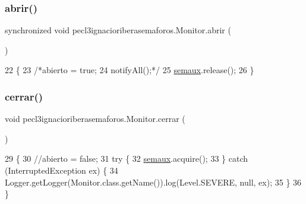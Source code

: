 \subsubsection{\texorpdfstring{abrir()}{abrir()}}
{\footnotesize\ttfamily synchronized void pecl3ignacioriberasemaforos.\+Monitor.\+abrir (\begin{DoxyParamCaption}{ }\end{DoxyParamCaption})\hspace{0.3cm}{\ttfamily [inline]}}


\begin{DoxyCode}
22     \{
23         \textcolor{comment}{/*abierto = true;}
24 \textcolor{comment}{        notifyAll();*/}
25         \mbox{\hyperlink{classpecl3ignacioriberasemaforos_1_1_monitor_add0c5e8d57580a613d07b14abac72354}{semaux}}.release();
26     \}
\end{DoxyCode}
\mbox{\label{classpecl3ignacioriberasemaforos_1_1_monitor_a7ff2d70abae6eea63a0eb96ffd1112df}} 
\subsubsection{\texorpdfstring{cerrar()}{cerrar()}}
{\footnotesize\ttfamily void pecl3ignacioriberasemaforos.\+Monitor.\+cerrar (\begin{DoxyParamCaption}{ }\end{DoxyParamCaption})\hspace{0.3cm}{\ttfamily [inline]}}


\begin{DoxyCode}
29     \{
30         \textcolor{comment}{//abierto = false;}
31         \textcolor{keywordflow}{try} \{
32             \mbox{\hyperlink{classpecl3ignacioriberasemaforos_1_1_monitor_add0c5e8d57580a613d07b14abac72354}{semaux}}.acquire();
33         \} \textcolor{keywordflow}{catch} (InterruptedException ex) \{
34             Logger.getLogger(Monitor.class.getName()).log(Level.SEVERE, null, ex);
35         \}
36     \}
\end{DoxyCode}
\mbox{\label{classpecl3ignacioriberasemaforos_1_1_monitor_a5bad35ef1f814400404e5e846db6a88f}} 
